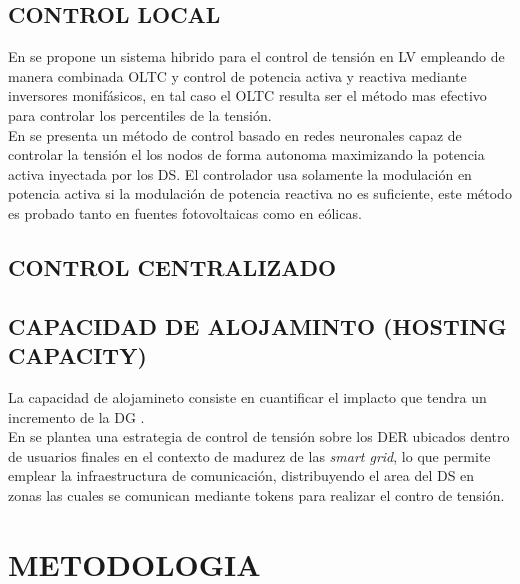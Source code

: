 \documentclass[12pt, letterpaper]{report}
\begin{document}
\section{CONTROL LOCAL}
En \cite{Efkarpidis2016} se propone un sistema hibrido para el control de tensión en LV empleando de manera combinada OLTC y control de potencia activa y reactiva mediante inversores monifásicos, en tal caso el OLTC resulta ser el método mas efectivo para controlar los percentiles de la tensión.\\ En \cite{Calderaro2014} se presenta un método de control basado en redes neuronales  capaz de controlar la tensión el los nodos de forma autonoma maximizando la potencia activa inyectada por los DS. El controlador usa solamente la modulación en potencia activa si la modulación  de potencia reactiva no es suficiente, este método es probado tanto en fuentes fotovoltaicas  como en eólicas.\\  
\section{CONTROL CENTRALIZADO}
\section{CAPACIDAD DE ALOJAMINTO (HOSTING CAPACITY)}	
La capacidad de alojamineto consiste en cuantificar el implacto que tendra un incremento de la DG \cite{Bollen2008}.\\
En \cite{Caldon2015a} se plantea una estrategia de control de tensión sobre los DER ubicados dentro  de usuarios finales en el contexto de madurez de las \textit{smart grid}, lo que permite emplear la infraestructura de comunicación, distribuyendo el area del DS en zonas las cuales se comunican mediante tokens para realizar el contro de tensión.\\

\chapter{METODOLOGIA}
\end{document}
